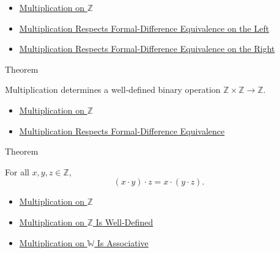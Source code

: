 \begin{dependencies}
\begin{itemize}
  \item \hyperref[def:multiplication-on-z-classes]{Multiplication on $\mathbb{Z}$}
  \item \hyperref[lem:multiplication-on-z-classes-respects-left-equivalence]{Multiplication Respects Formal-Difference Equivalence on the Left}
  \item \hyperref[lem:multiplication-on-z-classes-respects-right-equivalence]{Multiplication Respects Formal-Difference Equivalence on the Right}
\end{itemize}
\end{dependencies}

\begin{theorembox}{Theorem}
\begin{theorem}
\label{thm:multiplication-on-z-well-defined}
Multiplication determines a well-defined binary operation
$\mathbb{Z}\times\mathbb{Z}\to\mathbb{Z}$.
\end{theorem}
\end{theorembox}

\begin{dependencies}
\begin{itemize}
  \item \hyperref[def:multiplication-on-z-classes]{Multiplication on $\mathbb{Z}$}
  \item \hyperref[lem:multiplication-on-z-classes-respects-equivalence]{Multiplication Respects Formal-Difference Equivalence}
\end{itemize}
\end{dependencies}

\begin{theorembox}{Theorem}
\begin{theorem}
\label{thm:multiplication-on-z-associative}
For all $x,y,z\in\mathbb{Z}$,
\[
(x\cdot y)\cdot z=x\cdot(y\cdot z).
\]
\end{theorem}
\end{theorembox}

\begin{dependencies}
\begin{itemize}
  \item \hyperref[def:multiplication-on-z-classes]{Multiplication on $\mathbb{Z}$}
  \item \hyperref[thm:multiplication-on-z-well-defined]{Multiplication on $\mathbb{Z}$ Is Well-Defined}
  \item \hyperref[thm:multiplication-on-w-associative]{Multiplication on $\mathbb{W}$ Is Associative}
\end{itemize}
\end{dependencies}


